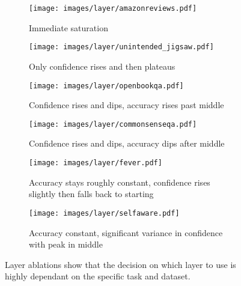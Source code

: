 \begin{figure}[th]
    \centering
    \begin{subfigure}[b]{0.45\textwidth}
        \texttt{[image: images/layer/amazonreviews.pdf]}
        \caption{Immediate saturation}
        \label{fig:layer_amazonnews}
    \end{subfigure}
    \vspace{0.5cm} %
    \begin{subfigure}[b]{0.45\textwidth}
        \texttt{[image: images/layer/unintended\_jigsaw.pdf]}
        \caption{Only confidence rises and then plateaus}
        \label{fig:layer_agnews}
    \end{subfigure}
    
    \begin{subfigure}[b]{0.45\textwidth}
    \texttt{[image: images/layer/openbookqa.pdf]}
    \caption{Confidence rises and dips, accuracy rises past middle}
    \label{fig:layer_amazon}
    \end{subfigure}
    \hfill
    \begin{subfigure}[b]{0.45\textwidth}
    \texttt{[image: images/layer/commonsenseqa.pdf]}
    \caption{Confidence rises and dips, accuracy dips after middle}
    \label{fig:layer_csqa}
    \end{subfigure}

    \vspace{0.5cm} %
    \begin{subfigure}[b]{0.45\textwidth}
    \texttt{[image: images/layer/fever.pdf]}
    \caption{Accuracy stays roughly constant, confidence rises slightly then falls back to starting}
    \label{fig:layer_fever}
    \end{subfigure}
    \hfill
    \begin{subfigure}[b]{0.45\textwidth}
    \texttt{[image: images/layer/selfaware.pdf]}
    \caption{Accuracy constant, significant variance in confidence with peak in middle}
    \label{fig:layer_mmlu}
    \end{subfigure}
    \caption{Layer ablations show that the decision on which layer to use is highly dependant on the specific task and dataset.}
    \label{fig:all_layers}
\end{figure}